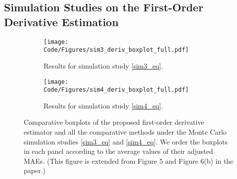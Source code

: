 \documentclass{uwstat572}
\theoremstyle{definition}
\theoremstyle{theorem}
\begin{document}
\subsection{Simulation Studies on the First-Order Derivative Estimation}
\label{Sec:sim_first_order}

\begin{figure}
	\captionsetup[subfigure]{justification=centering}
	\begin{subfigure}[t]{0.49\linewidth}
		\centering
		\texttt{[image: Code/Figures/sim3\_deriv\_boxplot\_full.pdf]}
		\caption{Results for simulation study \eqref{sim3_eq}.}
	\end{subfigure}
	\hfil
	\begin{subfigure}[t]{0.49\linewidth}
		\centering
		\texttt{[image: Code/Figures/sim4\_deriv\_boxplot\_full.pdf]}
		\caption{Results for simulation study \eqref{sim4_eq}.}
	\end{subfigure}
	\caption{Comparative boxplots of the proposed first-order derivative estimator and all the comparative methods under the Monte Carlo simulation studies \eqref{sim3_eq} and \eqref{sim4_eq}. We order the boxplots in each panel according to the average values of their adjusted MAEs. (This figure is extended from Figure 5 and Figure 6(b) in the paper.)}
	\label{fig:sim_first_boxplot}
\end{figure}
\end{document}

